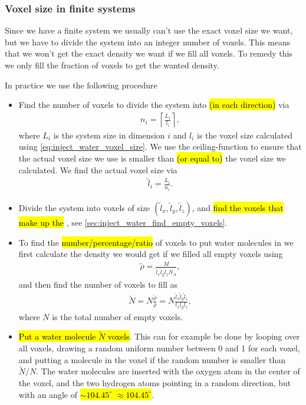 \subsubsection{Voxel size in finite systems}
Since we have a finite system we usually can't use the exact voxel size we want, but we have to divide the system into an integer number of voxels. This means that we won't get the exact density we want if we fill all voxels. To remedy this we only fill the fraction of voxels to get the wanted density.

In practice we use the following procedure
\begin{itemize}
    \item Find the number of voxels to divide the system into \hl{(in each direction)} via
    \begin{align*}
        n_i = \left\lceil \frac{L_i}{l_i} \right\rceil,
    \end{align*}
    where $L_i$ is the system size in dimension $i$ and $l_i$ is the voxel size calculated using \cref{eq:inject_water_voxel_size}. We use the ceiling-function to ensure that the actual voxel size we use is smaller than \hl{(or equal to)} the voxel size we calculated. We find the actual voxel size via
    \begin{align*}
        \tilde l_i = \frac{L_i}{n_i}.
    \end{align*}
    \item Divide the system into voxels of size $(\tilde l_x, \tilde l_y, \tilde l_z)$, and \hl{find the voxels that make up the }, see \cref{sec:inject_water_find_empty_voxels}.
    \item To find the \hl{number/percentage/ratio} of voxels to put water molecules in we first calculate the density  we would get if we filled all empty voxels using
    \begin{align*}
        \tilde\rho = \frac{M}{\tilde l_x \tilde l_y \tilde l_z N_A},
    \end{align*}
    and then find the number of voxels to fill as
    \begin{align*}
        \tilde N = N\frac{\tilde\rho}{\rho} = N\frac{\tilde l_x \tilde l_y \tilde l_z}{l_x l_y l_z},
    \end{align*}
    where $N$ is the total number of empty voxels.
    \item \hl{Put a water molecule $\tilde N$ voxels}. This can for example be done by looping over all voxels, drawing a random uniform number between 0 and 1 for each voxel, and putting a molecule in the voxel if the random number is smaller than $\tilde N / N$. The water molecules are inserted with the oxygen atom in the center of the voxel, and the two hydrogen atoms pointing in a random direction, but with an angle of \hl{$\sim 104.45^\circ$ $\approx 104.45^\circ$}.

\end{itemize}
